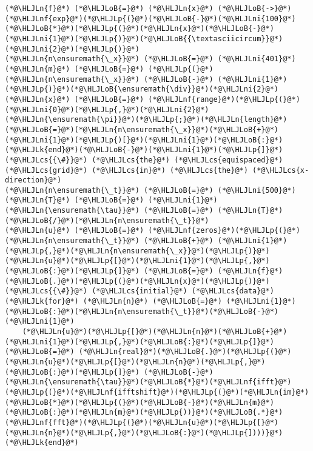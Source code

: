 \documentclass[12pt,a4paper]{article}
\newcommand{\HLJLk}[1]{\textcolor[RGB]{148,91,176}{\textbf{#1}}}
\newcommand{\HLJLn}[1]{#1}
\newcommand{\HLJLnf}[1]{\textcolor[RGB]{66,102,213}{#1}}
\newcommand{\HLJLni}[1]{\textcolor[RGB]{59,151,46}{#1}}
\newcommand{\HLJLoB}[1]{\textcolor[RGB]{102,102,102}{\textbf{#1}}}
\newcommand{\HLJLp}[1]{#1}
\newcommand{\HLJLcs}[1]{\textcolor[RGB]{153,153,119}{\textit{#1}}}
\begin{document}
\begin{lstlisting}
(*@\HLJLn{f}@*) (*@\HLJLoB{=}@*) (*@\HLJLn{x}@*) (*@\HLJLoB{->}@*) (*@\HLJLnf{exp}@*)(*@\HLJLp{(}@*)(*@\HLJLoB{-}@*)(*@\HLJLni{100}@*)(*@\HLJLoB{*}@*)(*@\HLJLp{(}@*)(*@\HLJLn{x}@*)(*@\HLJLoB{-}@*)(*@\HLJLni{1}@*)(*@\HLJLp{)}@*)(*@\HLJLoB{{\textasciicircum}}@*)(*@\HLJLni{2}@*)(*@\HLJLp{)}@*)
(*@\HLJLn{n\ensuremath{\_x}}@*) (*@\HLJLoB{=}@*) (*@\HLJLni{401}@*)
(*@\HLJLn{m}@*) (*@\HLJLoB{=}@*) (*@\HLJLp{(}@*)(*@\HLJLn{n\ensuremath{\_x}}@*) (*@\HLJLoB{-}@*) (*@\HLJLni{1}@*)(*@\HLJLp{)}@*)(*@\HLJLoB{\ensuremath{\div}}@*)(*@\HLJLni{2}@*)
(*@\HLJLn{x}@*) (*@\HLJLoB{=}@*) (*@\HLJLnf{range}@*)(*@\HLJLp{(}@*)(*@\HLJLni{0}@*)(*@\HLJLp{,}@*)(*@\HLJLni{2}@*)(*@\HLJLn{\ensuremath{\pi}}@*)(*@\HLJLp{;}@*)(*@\HLJLn{length}@*)(*@\HLJLoB{=}@*)(*@\HLJLn{n\ensuremath{\_x}}@*)(*@\HLJLoB{+}@*)(*@\HLJLni{1}@*)(*@\HLJLp{)[}@*)(*@\HLJLni{1}@*)(*@\HLJLoB{:}@*)(*@\HLJLk{end}@*)(*@\HLJLoB{-}@*)(*@\HLJLni{1}@*)(*@\HLJLp{]}@*) (*@\HLJLcs{{\#}}@*) (*@\HLJLcs{the}@*) (*@\HLJLcs{equispaced}@*) (*@\HLJLcs{grid}@*) (*@\HLJLcs{in}@*) (*@\HLJLcs{the}@*) (*@\HLJLcs{x-direction}@*)
(*@\HLJLn{n\ensuremath{\_t}}@*) (*@\HLJLoB{=}@*) (*@\HLJLni{500}@*)
(*@\HLJLn{T}@*) (*@\HLJLoB{=}@*) (*@\HLJLni{1}@*)
(*@\HLJLn{\ensuremath{\tau}}@*) (*@\HLJLoB{=}@*) (*@\HLJLn{T}@*)(*@\HLJLoB{/}@*)(*@\HLJLn{n\ensuremath{\_t}}@*)
(*@\HLJLn{u}@*) (*@\HLJLoB{=}@*) (*@\HLJLnf{zeros}@*)(*@\HLJLp{(}@*)(*@\HLJLn{n\ensuremath{\_t}}@*) (*@\HLJLoB{+}@*) (*@\HLJLni{1}@*)(*@\HLJLp{,}@*)(*@\HLJLn{n\ensuremath{\_x}}@*)(*@\HLJLp{)}@*)
(*@\HLJLn{u}@*)(*@\HLJLp{[}@*)(*@\HLJLni{1}@*)(*@\HLJLp{,}@*)(*@\HLJLoB{:}@*)(*@\HLJLp{]}@*) (*@\HLJLoB{=}@*) (*@\HLJLn{f}@*)(*@\HLJLoB{.}@*)(*@\HLJLp{(}@*)(*@\HLJLn{x}@*)(*@\HLJLp{)}@*)  (*@\HLJLcs{{\#}}@*) (*@\HLJLcs{initial}@*) (*@\HLJLcs{data}@*)
(*@\HLJLk{for}@*) (*@\HLJLn{n}@*) (*@\HLJLoB{=}@*) (*@\HLJLni{1}@*)(*@\HLJLoB{:}@*)(*@\HLJLn{n\ensuremath{\_t}}@*)(*@\HLJLoB{-}@*)(*@\HLJLni{1}@*)
    (*@\HLJLn{u}@*)(*@\HLJLp{[}@*)(*@\HLJLn{n}@*)(*@\HLJLoB{+}@*)(*@\HLJLni{1}@*)(*@\HLJLp{,}@*)(*@\HLJLoB{:}@*)(*@\HLJLp{]}@*) (*@\HLJLoB{=}@*) (*@\HLJLn{real}@*)(*@\HLJLoB{.}@*)(*@\HLJLp{(}@*)(*@\HLJLn{u}@*)(*@\HLJLp{[}@*)(*@\HLJLn{n}@*)(*@\HLJLp{,}@*)(*@\HLJLoB{:}@*)(*@\HLJLp{]}@*) (*@\HLJLoB{-}@*) (*@\HLJLn{\ensuremath{\tau}}@*)(*@\HLJLoB{*}@*)(*@\HLJLnf{ifft}@*)(*@\HLJLp{(}@*)(*@\HLJLnf{ifftshift}@*)(*@\HLJLp{(}@*)(*@\HLJLn{im}@*)(*@\HLJLoB{*}@*)(*@\HLJLp{(}@*)(*@\HLJLoB{-}@*)(*@\HLJLn{m}@*)(*@\HLJLoB{:}@*)(*@\HLJLn{m}@*)(*@\HLJLp{))}@*)(*@\HLJLoB{.*}@*)(*@\HLJLnf{fft}@*)(*@\HLJLp{(}@*)(*@\HLJLn{u}@*)(*@\HLJLp{[}@*)(*@\HLJLn{n}@*)(*@\HLJLp{,}@*)(*@\HLJLoB{:}@*)(*@\HLJLp{])))}@*)
(*@\HLJLk{end}@*)
\end{lstlisting}
\end{document}
